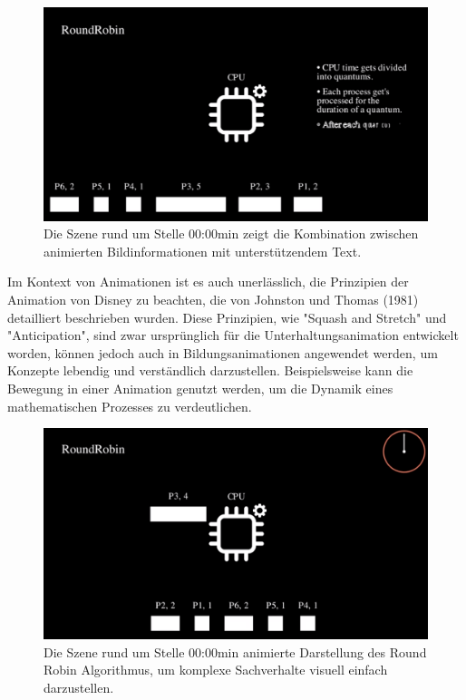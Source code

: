 \begin{figure}[h]
	\centering
	\includegraphics[width=0.8\linewidth]{img/screenshot_text.png} 
	\caption{Die Szene rund um Stelle 00:00min zeigt die Kombination zwischen animierten Bildinformationen mit unterstützendem Text.}
	\label{fig:screenshot_text} 
\end{figure}

Im Kontext von Animationen ist es auch unerlässlich, die Prinzipien der Animation von Disney zu beachten, die von Johnston und Thomas (1981) detailliert beschrieben wurden. Diese Prinzipien, wie "Squash and Stretch" und "Anticipation", sind zwar ursprünglich für die Unterhaltungsanimation entwickelt worden, können jedoch auch in Bildungsanimationen angewendet werden, um Konzepte lebendig und verständlich darzustellen. Beispielsweise kann die Bewegung in einer Animation genutzt werden, um die Dynamik eines mathematischen Prozesses zu verdeutlichen. 

\begin{figure}[h]
	\centering
	\includegraphics[width=0.8\linewidth]{img/screenshot_animation.png} 
	\caption{Die Szene rund um Stelle 00:00min animierte Darstellung des Round Robin Algorithmus, um komplexe Sachverhalte visuell einfach darzustellen.}
	\label{fig:screenshot_animation} 
\end{figure}

